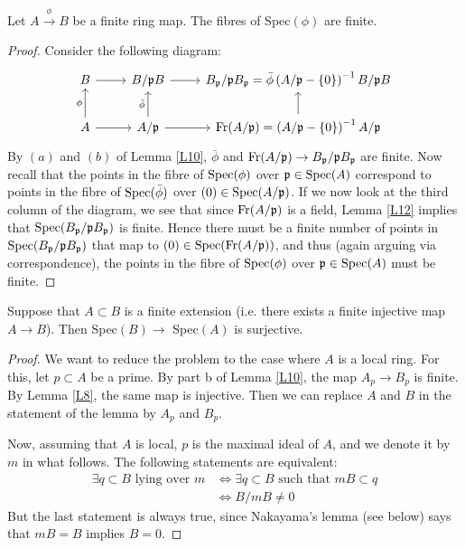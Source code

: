 \documentclass{../mathnotes}
\begin{document}
\begin{lem}
\label{L14}
Let $A \overset{\phi}{\to} B$ be a finite ring map. The fibres of Spec$(\phi)$ are finite.
\end{lem}
\begin{proof}
Consider the following diagram:
\[
\begin{tikzcd}
B\arrow{r}&B/\fr pB\arrow{r} & B_\fr p/\fr pB_\fr p=\bar\phi\left(A/\fr p-\{0\}\right)^{-1}B/\fr pB\\
A\arrow{r}\arrow{u}{\phi} & A/\fr p\arrow{r}\arrow{u}{\bar\phi}&\text{Fr}(A/\fr p)=\left(A/\fr p-\{0\}\right)^{-1}A/\fr p\arrow{u}
\end{tikzcd}
\]
By $(a)$ and $(b)$ of Lemma \ref{L10}, $\bar\phi$ and $\text{Fr}(A/\mathfrak p)\to B_\mathfrak p/\mathfrak pB_\mathfrak p$ are finite. Now recall that the points in the fibre of $\operatorname{Spec}(\phi)$ over $\mathfrak p\in\operatorname{Spec}(A)$ correspond to points in the fibre of $\operatorname{Spec}(\bar \phi)$ over $(0)\in\operatorname{Spec}(A/\mathfrak p)$. If we now look at the third column of the diagram, we see that since $\text{Fr}(A/\mathfrak p)$ is a field, Lemma \ref{L12} implies that $\operatorname{Spec}(B_\mathfrak p/\mathfrak pB_\mathfrak p)$ is finite. Hence there must be a finite number of points in $\operatorname{Spec}(B_\mathfrak p/\mathfrak pB_\mathfrak p)$ that map to $(0)\in\operatorname{Spec}(\text{Fr}(A/\mathfrak p))$, and thus (again arguing via correspondence), the points in the fibre of $\operatorname{Spec}(\phi)$ over $\mathfrak p\in\operatorname{Spec}(A)$ must be finite.
\end{proof}

\begin{lem}
\label{L15}
Suppose that $A\subset B$ is a finite extension (i.e. there exists a finite injective map $A\to B$). Then Spec$(B) \to $ Spec$(A)$ is surjective.
\end{lem}
\begin{proof}
We want to reduce the problem to the case where $A$ is a local ring. For this, let $p\subset A$ be a prime. By part b of Lemma \ref{L10}, the map $A_p \to B_p$ is finite. By Lemma \ref{L8}, the same map is injective. Then we can replace $A$ and $B$ in the statement of the lemma by $A_p$ and $B_p$.

Now, assuming that $A$ is local, $p$ is the maximal ideal of $A$, and we denote it by $m$ in what follows. The following statements are equivalent:
\begin{align*}
 \exists q \subset B \text{ lying over } m &\Leftrightarrow \exists q\subset B \text{ such that } mB \subset q
 \\   & \Leftrightarrow B/mB \neq 0
\end{align*}
But the last statement is always true, since Nakayama's lemma (see below) says that $mB = B$ implies $B = 0$.
\end{proof}
\end{document}
